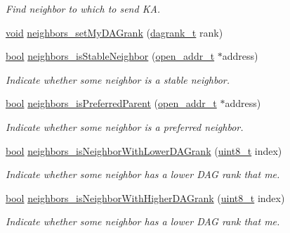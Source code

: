 \begin{DoxyCompactItemize}
\begin{DoxyCompactList}\small\item\em Find neighbor to which to send KA. \end{DoxyCompactList}\item 
\hyperlink{usb__devapi_8h_afabf60e7f57651d6d595a02c75f07cd0}{void} \hyperlink{group___neighbors_gaa6ff67c38ad56955395d474be68a47e5}{neighbors\+\_\+set\+My\+D\+A\+Grank} (\hyperlink{opendefs_8h_a502861d0bb432f5702761bd854023e21}{dagrank\+\_\+t} rank)
\item 
\hyperlink{_p_e___types_8h_a97a80ca1602ebf2303258971a2c938e2}{bool} \hyperlink{group___neighbors_gada9893dd745640061b063a06c67be154}{neighbors\+\_\+is\+Stable\+Neighbor} (\hyperlink{structopen__addr__t}{open\+\_\+addr\+\_\+t} $\ast$address)
\begin{DoxyCompactList}\small\item\em Indicate whether some neighbor is a stable neighbor. \end{DoxyCompactList}\item 
\hyperlink{_p_e___types_8h_a97a80ca1602ebf2303258971a2c938e2}{bool} \hyperlink{group___neighbors_ga6811829f946d51d6e30b2f9f812df133}{neighbors\+\_\+is\+Preferred\+Parent} (\hyperlink{structopen__addr__t}{open\+\_\+addr\+\_\+t} $\ast$address)
\begin{DoxyCompactList}\small\item\em Indicate whether some neighbor is a preferred neighbor. \end{DoxyCompactList}\item 
\hyperlink{_p_e___types_8h_a97a80ca1602ebf2303258971a2c938e2}{bool} \hyperlink{group___neighbors_ga3a84fbff4104444fdab844d9cbaa0c77}{neighbors\+\_\+is\+Neighbor\+With\+Lower\+D\+A\+Grank} (\hyperlink{_p_e___types_8h_aba7bc1797add20fe3efdf37ced1182c5}{uint8\+\_\+t} index)
\begin{DoxyCompactList}\small\item\em Indicate whether some neighbor has a lower D\+AG rank that me. \end{DoxyCompactList}\item 
\hyperlink{_p_e___types_8h_a97a80ca1602ebf2303258971a2c938e2}{bool} \hyperlink{group___neighbors_gac13c1a5dda0cc06109b811f093b1a400}{neighbors\+\_\+is\+Neighbor\+With\+Higher\+D\+A\+Grank} (\hyperlink{_p_e___types_8h_aba7bc1797add20fe3efdf37ced1182c5}{uint8\+\_\+t} index)
\begin{DoxyCompactList}\small\item\em Indicate whether some neighbor has a lower D\+AG rank that me. \end{DoxyCompactList}\item 

\end{DoxyCompactItemize}
